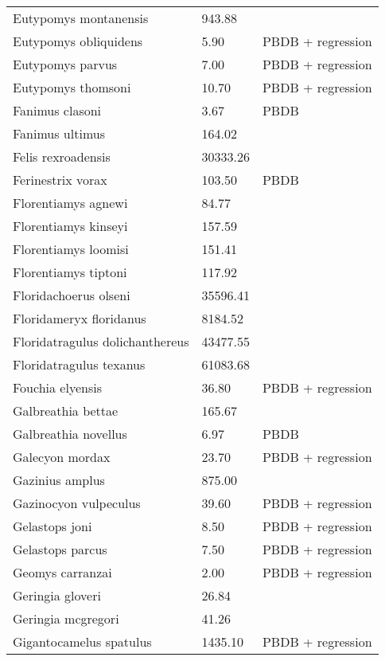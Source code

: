 \documentclass{article}
\begin{document}
\begin{center}
\begin{longtable}{p{} p{} p{}}
    Eutypomys montanensis & 943.88 & \cite{Tomiya2013} \\ 
    Eutypomys obliquidens & 5.90 & PBDB + regression \\ 
    Eutypomys parvus & 7.00 & PBDB + regression \\ 
    Eutypomys thomsoni & 10.70 & PBDB + regression \\ 
    Fanimus clasoni & 3.67 & PBDB \\ 
    Fanimus ultimus & 164.02 & \cite{Tomiya2013} \\ 
    Felis rexroadensis & 30333.26 & \cite{Tomiya2013} \\ 
    Ferinestrix vorax & 103.50 & PBDB \\ 
    Florentiamys agnewi & 84.77 & \cite{Tomiya2013} \\ 
    Florentiamys kinseyi & 157.59 & \cite{Tomiya2013} \\ 
    Florentiamys loomisi & 151.41 & \cite{Tomiya2013} \\ 
    Florentiamys tiptoni & 117.92 & \cite{Tomiya2013} \\ 
    Floridachoerus olseni & 35596.41 & \cite{Tomiya2013} \\ 
    Floridameryx floridanus & 8184.52 & \cite{Tomiya2013} \\ 
    Floridatragulus dolichanthereus & 43477.55 & \cite{Tomiya2013} \\ 
    Floridatragulus texanus & 61083.68 & \cite{Tomiya2013} \\ 
    Fouchia elyensis & 36.80 & PBDB + regression \\ 
    Galbreathia bettae & 165.67 & \cite{Tomiya2013} \\ 
    Galbreathia novellus & 6.97 & PBDB \\ 
    Galecyon mordax & 23.70 & PBDB + regression \\ 
    Gazinius amplus & 875.00 & \cite{Soligo2006} \\ 
    Gazinocyon vulpeculus & 39.60 & PBDB + regression \\ 
    Gelastops joni & 8.50 & PBDB + regression \\ 
    Gelastops parcus & 7.50 & PBDB + regression \\ 
    Geomys carranzai & 2.00 & PBDB + regression \\ 
    Geringia gloveri & 26.84 & \cite{Tomiya2013} \\ 
    Geringia mcgregori & 41.26 & \cite{Tomiya2013} \\ 
    Gigantocamelus spatulus & 1435.10 & PBDB + regression \\ 

\end{longtable}
\end{center}
\end{document}
